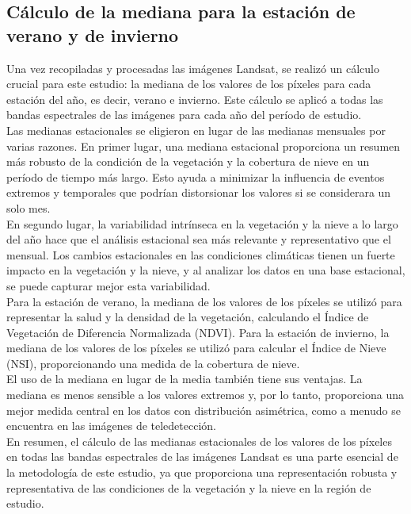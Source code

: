 {\small
\subsection{\textbf{Cálculo de la mediana para la estación de verano y de invierno}}
Una vez recopiladas y procesadas las imágenes Landsat, se realizó un cálculo crucial para este estudio: la mediana de los valores de los píxeles para cada estación del año, es decir, verano e invierno. Este cálculo se aplicó a todas las bandas espectrales de las imágenes para cada año del período de estudio.\\

Las medianas estacionales se eligieron en lugar de las medianas mensuales por varias razones. En primer lugar, una mediana estacional proporciona un resumen más robusto de la condición de la vegetación y la cobertura de nieve en un período de tiempo más largo. Esto ayuda a minimizar la influencia de eventos extremos y temporales que podrían distorsionar los valores si se considerara un solo mes.\\

En segundo lugar, la variabilidad intrínseca en la vegetación y la nieve a lo largo del año hace que el análisis estacional sea más relevante y representativo que el mensual. Los cambios estacionales en las condiciones climáticas tienen un fuerte impacto en la vegetación y la nieve, y al analizar los datos en una base estacional, se puede capturar mejor esta variabilidad.\\

Para la estación de verano, la mediana de los valores de los píxeles se utilizó para representar la salud y la densidad de la vegetación, calculando el Índice de Vegetación de Diferencia Normalizada (NDVI). Para la estación de invierno, la mediana de los valores de los píxeles se utilizó para calcular el Índice de Nieve (NSI), proporcionando una medida de la cobertura de nieve.\\

El uso de la mediana en lugar de la media también tiene sus ventajas. La mediana es menos sensible a los valores extremos y, por lo tanto, proporciona una mejor medida central en los datos con distribución asimétrica, como a menudo se encuentra en las imágenes de teledetección.\\

En resumen, el cálculo de las medianas estacionales de los valores de los píxeles en todas las bandas espectrales de las imágenes Landsat es una parte esencial de la metodología de este estudio, ya que proporciona una representación robusta y representativa de las condiciones de la vegetación y la nieve en la región de estudio.\\
}

